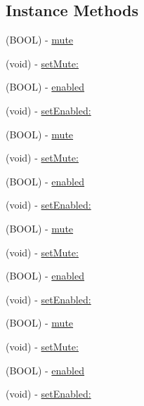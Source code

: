 \subsection*{Instance Methods}
\begin{DoxyCompactItemize}
\item 
(B\+O\+OL) -\/ \hyperlink{protocolCDAudioInterruptProtocol_01-p_a3ab850f4ef17f6d309ea0313ba5bf522}{mute}
\item 
(void) -\/ \hyperlink{protocolCDAudioInterruptProtocol_01-p_aaa4811c33b3720f9d9b014e861211563}{set\+Mute\+:}
\item 
(B\+O\+OL) -\/ \hyperlink{protocolCDAudioInterruptProtocol_01-p_a9e878d62414654c6ae3971fe51b16c3e}{enabled}
\item 
(void) -\/ \hyperlink{protocolCDAudioInterruptProtocol_01-p_a22820382ad919dca8e8750e03cda1fe3}{set\+Enabled\+:}
\item 
(B\+O\+OL) -\/ \hyperlink{protocolCDAudioInterruptProtocol_01-p_a3ab850f4ef17f6d309ea0313ba5bf522}{mute}
\item 
(void) -\/ \hyperlink{protocolCDAudioInterruptProtocol_01-p_aaa4811c33b3720f9d9b014e861211563}{set\+Mute\+:}
\item 
(B\+O\+OL) -\/ \hyperlink{protocolCDAudioInterruptProtocol_01-p_a9e878d62414654c6ae3971fe51b16c3e}{enabled}
\item 
(void) -\/ \hyperlink{protocolCDAudioInterruptProtocol_01-p_a22820382ad919dca8e8750e03cda1fe3}{set\+Enabled\+:}
\item 
(B\+O\+OL) -\/ \hyperlink{protocolCDAudioInterruptProtocol_01-p_a3ab850f4ef17f6d309ea0313ba5bf522}{mute}
\item 
(void) -\/ \hyperlink{protocolCDAudioInterruptProtocol_01-p_aaa4811c33b3720f9d9b014e861211563}{set\+Mute\+:}
\item 
(B\+O\+OL) -\/ \hyperlink{protocolCDAudioInterruptProtocol_01-p_a9e878d62414654c6ae3971fe51b16c3e}{enabled}
\item 
(void) -\/ \hyperlink{protocolCDAudioInterruptProtocol_01-p_a22820382ad919dca8e8750e03cda1fe3}{set\+Enabled\+:}
\item 
(B\+O\+OL) -\/ \hyperlink{protocolCDAudioInterruptProtocol_01-p_a3ab850f4ef17f6d309ea0313ba5bf522}{mute}
\item 
(void) -\/ \hyperlink{protocolCDAudioInterruptProtocol_01-p_aaa4811c33b3720f9d9b014e861211563}{set\+Mute\+:}
\item 
(B\+O\+OL) -\/ \hyperlink{protocolCDAudioInterruptProtocol_01-p_a9e878d62414654c6ae3971fe51b16c3e}{enabled}
\item 
(void) -\/ \hyperlink{protocolCDAudioInterruptProtocol_01-p_a22820382ad919dca8e8750e03cda1fe3}{set\+Enabled\+:}
\end{DoxyCompactItemize}


